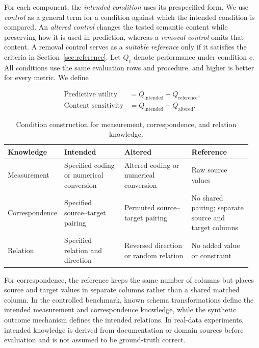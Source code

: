 \documentclass{article} %
\begin{document}
For each component, the \emph{intended condition} uses its prespecified form.
We use \emph{control} as a general term for a condition against which the intended condition is compared.
An \emph{altered control} changes the tested semantic content while preserving how it is used in prediction, whereas a \emph{removal control} omits that content.
A removal control serves as a \emph{suitable reference} only if it satisfies the criteria in Section~\ref{sec:reference}.
Let $Q_c$ denote performance under condition $c$.
All conditions use the same evaluation rows and procedure, and higher is better for every metric.
We define

\begin{align}
\text{Predictive utility}
    &= Q_{\mathrm{intended}} - Q_{\mathrm{reference}},\\
\text{Content sensitivity}
    &= Q_{\mathrm{intended}} - Q_{\mathrm{altered}}.
\end{align}

\begin{table}[h]
\caption{Condition construction for measurement, correspondence, and relation knowledge.}
\label{tab:knowledge_conditions}
\centering
\fontsize{8pt}{9pt}\selectfont
\setlength{\tabcolsep}{3pt}
\renewcommand{\arraystretch}{0.92}

\begin{tabular}{@{}P{0.16\linewidth}P{0.25\linewidth}P{0.29\linewidth}P{0.25\linewidth}@{}}
\toprule
Knowledge & Intended & Altered & Reference \\
\midrule

Measurement &
Specified coding or numerical conversion &
Altered coding or numerical conversion &
Raw source values \\

Correspondence &
Specified source--target pairing &
Permuted source--target pairing &
No shared pairing; separate source and target columns \\

Relation &
Specified relation and direction &
Reversed direction or random relation &
No added value or constraint \\

\bottomrule
\end{tabular}
\end{table}

For correspondence, the reference keeps the same number of columns but places source and target values in separate columns rather than a shared matched column.
In the controlled benchmark, known schema transformations define the intended measurement and correspondence knowledge, while the synthetic outcome mechanism defines the intended relations.
In real-data experiments, intended knowledge is derived from documentation or domain sources before evaluation and is not assumed to be ground-truth correct.
\end{document}
